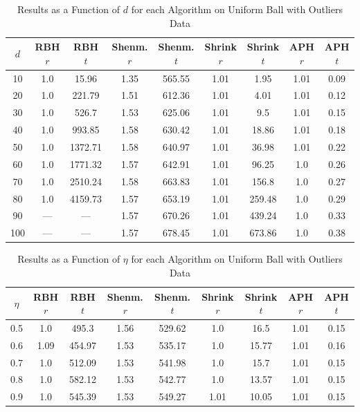 \documentclass[11pt,twoside]{report}
\theoremstyle{definition}
\numberwithin{theorem}{section}
\numberwithin{definition}{section}
\numberwithin{lemma}{section}
\numberwithin{proposition}{section}
\numberwithin{equation}{section}
\numberwithin{figure}{section}
\begin{document}
\begin{appendices}
    \begin{table}[ht]
        \centering
        \begin{tabular}{|c||c|c||c|c||c|c||c|c|} \hline
            $d$&RBH $r$&RBH $t$&Shenm. $r$&Shenm. $t$&Shrink $r$&Shrink $t$&APH $r$&APH $t$ \\ \hline
            10&1.0&15.96&1.35&565.55&1.01&1.95&1.01&0.09 \\
            20&1.0&221.79&1.51&612.36&1.01&4.01&1.01&0.12 \\
            30&1.0&526.7&1.53&625.06&1.01&9.5&1.01&0.15 \\
            40&1.0&993.85&1.58&630.42&1.01&18.86&1.01&0.18 \\
            50&1.0&1372.71&1.58&640.97&1.01&36.98&1.01&0.22 \\
            60&1.0&1771.32&1.57&642.91&1.01&96.25&1.0&0.26 \\
            70&1.0&2510.24&1.58&663.83&1.01&156.8&1.0&0.27 \\
            80&1.0&4159.73&1.57&653.19&1.01&259.48&1.0&0.29 \\
            90&---&---&1.57&670.26&1.01&439.24&1.0&0.33 \\
            100&---&---&1.57&678.45&1.01&673.86&1.0&0.38 \\ \hline
        \end{tabular}
        \caption{Results as a Function of $d$ for each Algorithm on Uniform Ball with Outliers Data}
        \label{tab:uniform_ball_with_outliers_table_d}
    \end{table}
    
    \begin{table}[ht]
        \centering
        \begin{tabular}{|c||c|c||c|c||c|c||c|c|} \hline
            $\eta$&RBH $r$&RBH $t$&Shenm. $r$&Shenm. $t$&Shrink $r$&Shrink $t$&APH $r$&APH $t$ \\ \hline
            0.5&1.0&495.3&1.56&529.62&1.0&16.5&1.01&0.15 \\
            0.6&1.09&454.97&1.53&535.17&1.0&15.77&1.01&0.16 \\
            0.7&1.0&512.09&1.53&541.98&1.0&15.7&1.01&0.15 \\
            0.8&1.0&582.12&1.53&542.77&1.0&13.57&1.01&0.15 \\
            0.9&1.0&545.39&1.53&549.27&1.01&10.05&1.01&0.15 \\ \hline
        \end{tabular}
        \caption{Results as a Function of $\eta$ for each Algorithm on Uniform Ball with Outliers Data}
        \label{tab:uniform_ball_with_outliers_table_eta}
    \end{table}


\end{appendices}
\end{document}

